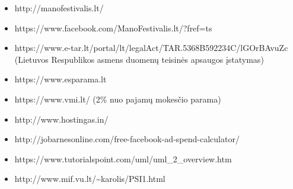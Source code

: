 \documentclass{VUMIFPSkursinis}
\begin{document}
\begin{itemize}
\item http://manofestivalis.lt/
\item https://www.facebook.com/ManoFestivalis.lt/?fref=ts
\item https://www.e-tar.lt/portal/lt/legalAct/TAR.5368B592234C/lGOrBAvuZc (Lietuvos Respublikos asmens duomenų teisinės apsaugos įstatymas)
\item https://www.esparama.lt
\item https://www.vmi.lt/ (2\% nuo pajamų mokesčio parama)
\item http://www.hostingas.in/
\item http://jobarnesonline.com/free-facebook-ad-spend-calculator/
\item https://www.tutorialspoint.com/uml/uml\_2\_overview.htm
\item http://www.mif.vu.lt/\textasciitilde karolis/PSI1.html
\end{itemize}


%
%
\end{document}
